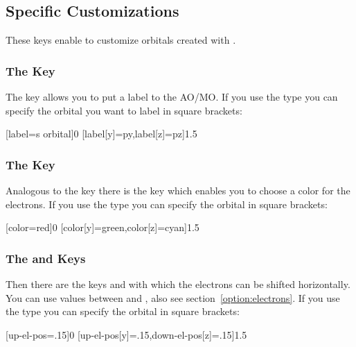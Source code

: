 \documentclass[load-preamble+]{cnltx-doc}
\begin{document}
\subsection{ Specific Customizations}\label{ssec:AO_anpassen}
These keys enable to customize orbitals created with .

\subsubsection{The  Key}\label{key:AO_label}
The key  allows you to put a
label to the \ac{AO}/\ac{MO}.  If you use the type  you can specify
the orbital you want to label in square brackets:
\begin{example}
  \begin{modiagram}[style=square]
    [label={s orbital}]{0}
    [label[y]=py,label[z]=pz]{1.5}
  \end{modiagram}
\end{example}

\subsubsection{The  Key}\label{key:AO_color}
Analogous to the  key there is the key
 which enables you to choose a
color for the electrons.  If you use the type  you can specify the
orbital in square brackets:
\begin{example}
  \begin{modiagram}[style=square]
    [color=red]{0}
    [color[y]=green,color[z]=cyan]{1.5}
  \end{modiagram}
\end{example}

\subsubsection{The  and  Keys}\label{key:AO_electrons}
Then there are the keys 
and  with which the
electrons can be shifted horizontally.  You can use values between 
and , also see section~\ref{option:electrons}.  If you use the type
 you can specify the orbital in square brackets:
\begin{example}
  \begin{modiagram}[style=square]
    [up-el-pos=.15]{0}
    [up-el-pos[y]=.15,down-el-pos[z]=.15]{1.5}
  \end{modiagram}
\end{example}
\end{document}
